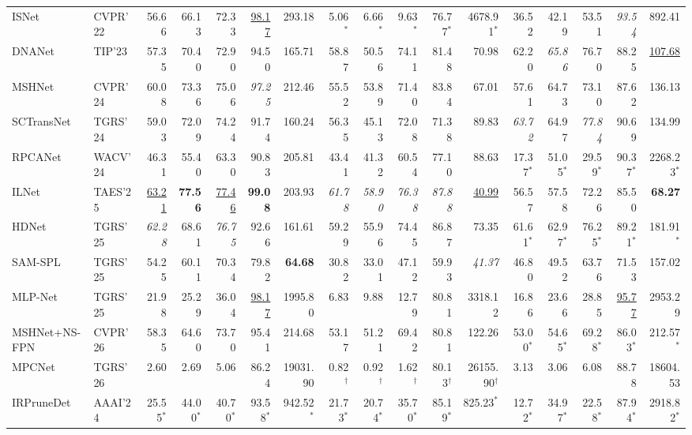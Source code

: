 \begin{table}[!t]
{\begin{tabular}{ll|rrrrr|rrrrr|rrrrr}
\hline
ISNet & CVPR'22 & 56.66 & 66.13 & 72.33 & \underline{98.17} & 293.18 & 5.06$^{*}$ & 6.66$^{*}$ & 9.63$^{*}$ & 76.77$^{*}$ & 4678.91$^{*}$ & 36.52 & 42.19 & 53.51 & \textit{93.54} & 892.41 \\
DNANet & TIP'23 & 57.35 & 70.40 & 72.90 & 94.50 & 165.71 & 58.87 & 50.56 & 74.11 & 81.48 & 70.98 & 62.20 & \textit{65.86} & 76.70 & 88.25 & \underline{107.68} \\
MSHNet & CVPR'24 & 60.08 & 73.36 & 75.06 & \textit{97.25} & 212.46 & 55.52 & 53.89 & 71.40 & 83.84 & 67.01 & 57.61 & 64.73 & 73.10 & 87.62 & 136.13 \\
SCTransNet & TGRS'24 & 59.03 & 72.09 & 74.24 & 91.74 & 160.24 & 56.35 & 45.13 & 72.08 & 71.38 & 89.83 & \textit{63.72} & 64.97 & \textit{77.84} & 90.69 & 134.99 \\
RPCANet & WACV'24 & 46.31 & 55.40 & 63.30 & 90.83 & 205.81 & 43.41 & 41.32 & 60.54 & 77.10 & 88.63 & 17.37$^{*}$ & 51.05$^{*}$ & 29.59$^{*}$ & 90.37$^{*}$ & 2268.23$^{*}$ \\
ILNet & TAES'25 & \underline{63.21} & \textbf{77.56} & \underline{77.46} & \textbf{99.08} & 203.93 & \textit{61.78} & \textit{58.90} & \textit{76.38} & \textit{87.88} & \underline{40.99} & 56.57 & 57.58 & 72.26 & 85.50 & \textbf{68.27} \\
HDNet & TGRS'25 & \textit{62.28} & 68.61 & \textit{76.75} & 92.66 & 161.61 & 59.29 & 55.96 & 74.45 & 86.87 & 73.35 & 61.61$^{*}$ & 62.97$^{*}$ & 76.25$^{*}$ & 89.21$^{*}$ & 181.91$^{*}$ \\
SAM-SPL & TGRS'25 & 54.25 & 60.11 & 70.34 & 79.82 & \textbf{64.68} & 30.82 & 33.01 & 47.12 & 59.93 & \textit{41.37} & 46.80 & 49.52 & 63.76 & 71.53 & 157.02 \\
MLP-Net & TGRS'25 & 21.98 & 25.29 & 36.04 & \underline{98.17} & 1995.80 & 6.83 & 9.88 & 12.79 & 80.81 & 3318.12 & 16.86 & 23.66 & 28.85 & \underline{95.77} & 2953.29 \\
MSHNet+NS-FPN & CVPR'26 & 58.35 & 64.60 & 73.70 & 95.41 & 214.68 & 53.17 & 51.21 & 69.42 & 80.81 & 122.26 & 53.00$^{*}$ & 54.65$^{*}$ & 69.28$^{*}$ & 86.03$^{*}$ & 212.57$^{*}$ \\
MPCNet & TGRS'26 & 2.60 & 2.69 & 5.06 & 86.24 & 19031.90 & 0.82$^{\dagger}$ & 0.92$^{\dagger}$ & 1.62$^{\dagger}$ & 80.13$^{\dagger}$ & 26155.90$^{\dagger}$ & 3.13 & 3.06 & 6.08 & 88.78 & 18604.53 \\
\hline
IRPruneDet & AAAI'24 & 25.55$^{*}$ & 44.00$^{*}$ & 40.70$^{*}$ & 93.58$^{*}$ & 942.52$^{*}$ & 21.73$^{*}$ & 20.74$^{*}$ & 35.70$^{*}$ & 85.19$^{*}$ & 825.23$^{*}$ & 12.72$^{*}$ & 34.97$^{*}$ & 22.58$^{*}$ & 87.94$^{*}$ & 2918.82$^{*}$ \\

\end{tabular}}
\end{table}
